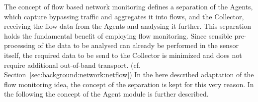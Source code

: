 The concept of flow based network monitoring defines a separation of the Agents, which capture bypassing traffic and aggregates it into flows, and the Collector, receiving the flow data from the Agents and analysing it further.
This separation holds the fundamental benefit of employing flow monitoring. Since sensible pre-processing of the data to be analysed can already be performed in the sensor itself, the required data to be send to the Collector is minimized and does not require additional out-of-band transport. (cf. Section~\ref{sec:background:network:netflow})
In the here described adaptation of the flow monitoring idea, the concept of the separation is kept for this very reason. In the following the concept of the Agent module is further described.

